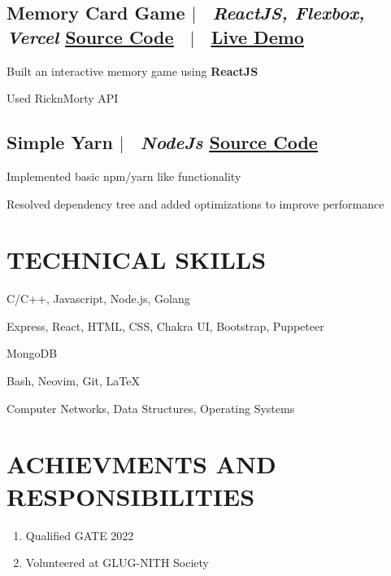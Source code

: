 \documentclass[11pt]{article}
\begin{document}
\subsection*{
  Memory Card Game 
  $|$ 
  \normalsize \normalfont \ \textit{ReactJS, Flexbox, Vercel }
  \hfill
  \normalsize \underline{\href{https://github.com/harsh-sheth/memory_card_game}{Source Code}}
  \ $|$ \ 
  \normalsize \underline{\href{https://harsh-sheth.github.io/memory_card_game}{Live Demo}}
}
  \begin{description}
    \setlength{\itemsep}{0em}
    \setlength{\itemindent}{2\parindent}
    \item[$\bullet$]{Built an interactive memory game using \textbf{ReactJS}}
    \item[$\bullet$]{Used RicknMorty API}
  \end{description}

\subsection*{
  Simple Yarn
  $|$ 
  \normalsize \normalfont \ \textit{NodeJs}
  \hfill 
  \normalsize \underline{\href{https://github.com/HARSH-SHETH/simple_yarn}{Source Code}}
}
  \begin{description}
    \setlength{\itemsep}{0em}
    \setlength{\itemindent}{2\parindent}
    \item[$\bullet$]{Implemented basic npm/yarn like functionality}
    \item[$\bullet$]{Resolved dependency tree and added optimizations to improve performance} 
  \end{description}



\section{TECHNICAL SKILLS}
\begin{description}
  \setlength{\itemindent}{\parindent}
  \setlength{\itemsep}{0em}
  \item[Languages:]{C/C++, Javascript, Node.js, Golang}
  \item[Web Technologies:]{Express, React, HTML, CSS, Chakra UI, Bootstrap, Puppeteer}
  \item[Database:]{MongoDB}
  \item[Tools:]{Bash, Neovim, Git, \LaTeX}
  \item[Coursework:]{Computer Networks, Data Structures,  Operating Systems}
\end{description}


\section{ACHIEVMENTS AND RESPONSIBILITIES}
\begin{enumerate}
  \setlength{\itemsep}{0em}
  \item Qualified GATE 2022
  \item Volunteered at GLUG-NITH Society
\end{enumerate}
\end{document}
